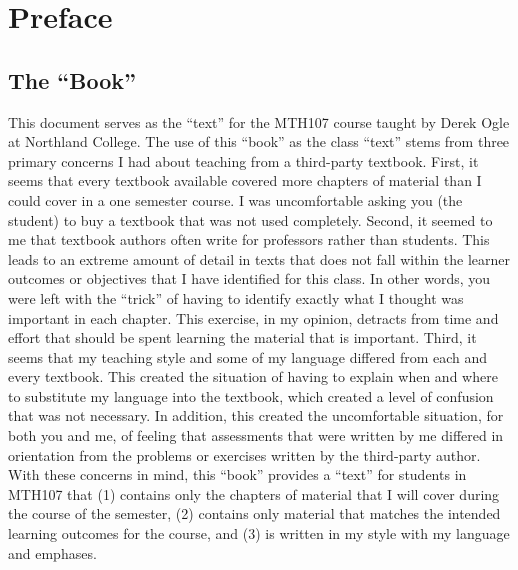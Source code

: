 \cleardoublepage                          %
\setlength{\cftbeforepartskip}{0.4em}     %

\vspace{-120pt}
\chapter*{Preface}                        %
\vspace{-80pt}
\section*{The ``Book''}
This document serves as the ``text'' for the MTH107 course taught by Derek Ogle at Northland College.  The use of this ``book'' as the class ``text'' stems from three primary concerns I had about teaching from a third-party textbook.  First, it seems that every textbook available covered more chapters of material than I could cover in a one semester course.  I was uncomfortable asking you (the student) to buy a textbook that was not used completely.  Second, it seemed to me that textbook authors often write for professors rather than students.  This leads to an extreme amount of detail in texts that does not fall within the learner outcomes or objectives that I have identified for this class.  In other words, you were left with the ``trick'' of having to identify exactly what I thought was important in each chapter.  This exercise, in my opinion, detracts from time and effort that should be spent learning the material that is important.  Third, it seems that my teaching style and some of my language differed from each and every textbook.  This created the situation of having to explain when and where to substitute my language into the textbook, which created a level of confusion that was not necessary.  In addition, this created the uncomfortable situation, for both you and me, of feeling that assessments that were written by me differed in orientation from the problems or exercises written by the third-party author.  With these concerns in mind, this ``book'' provides a ``text'' for students in MTH107 that (1) contains only the chapters of material that I will cover during the course of the semester, (2) contains only material that matches the intended learning outcomes for the course, and (3) is written in my style with my language and emphases.

